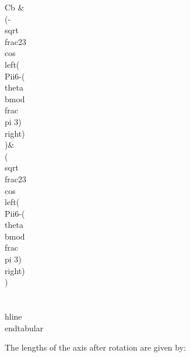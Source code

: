  Cb & \\(-\\sqrt{\\frac{2}{3}} \\cos \\left(\\Pii{6}-(\\theta  \\bmod \\frac{\\pi }{3})\\right) \\)&\\( \\sqrt{\\frac{2}{3}} \\cos \\left(\\Pii{6}-(\\theta  \\bmod \\frac{\\pi }{3})\\right) \\)\\\\
  \\hline
\\end{tabular}

The lengths of the axis after rotation are given by:

